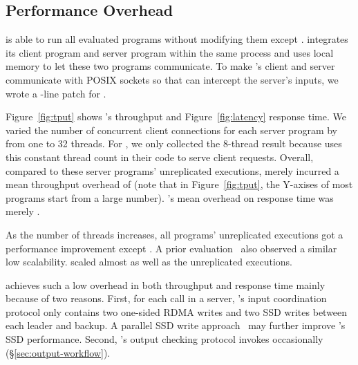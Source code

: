 \subsection{Performance Overhead} \label{sec:overhead}


\xxx is able to run all \nprog evaluated programs without modifying them except
\calvin. \calvin integrates its client program and server program within the
same process and uses local memory to let these two programs communicate. To
make \calvin's client and server communicate with POSIX sockets so that \xxx
can intercept the server's inputs, we wrote a \nlinescalvin-line patch for
\calvin.

Figure~\ref{fig:tput} shows \xxx's throughput and Figure~\ref{fig:latency}
response time. We varied the number of concurrent client connections for each
server program by from one to 32 threads. For \calvin, we only collected the
8-thread result because \calvin uses this constant thread count in their code
to serve client requests. Overall, compared to these server programs'
unreplicated executions, \xxx merely incurred a mean throughput overhead of
\tputoverhead (note that in Figure~\ref{fig:tput}, the Y-axises of most programs
start from a large number). \xxx's mean overhead on response time was merely
\latencyoverhead.

As the number of threads increases, all programs' unreplicated executions
got a performance improvement except \memcached. A prior
evaluation~\cite{rex:eurosys14} also observed a similar \memcached low
scalability. \xxx scaled almost as well as the unreplicated executions.

\xxx achieves such a low overhead in both throughput and response time mainly
because of two reasons. First, for each \recv call in a server, \xxx's input
coordination protocol only contains two one-sided RDMA writes and two SSD writes
between each leader and backup. A parallel SSD write
approach~\cite{Bessani:usenix13} may further improve \xxx's SSD performance.
Second, \xxx's output checking protocol invokes occasionally
(\S\ref{sec:output-workflow}).

